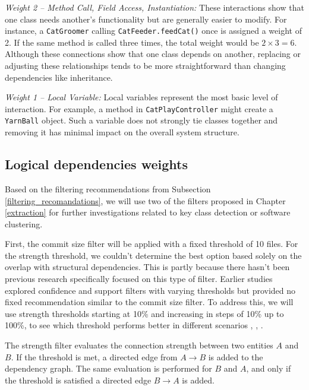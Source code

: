\textit{Weight 2 – Method Call, Field Access, Instantiation:}  
These interactions show that one class needs another’s functionality but are generally easier to modify. For instance, a \texttt{CatGroomer} calling \texttt{CatFeeder.feedCat()} once is assigned a weight of 2. If the same method is called three times, the total weight would be \(2 \times 3 = 6\). Although these connections show that one class depends on another, replacing or adjusting these relationships tends to be more straightforward than changing dependencies like inheritance.

\textit{Weight 1 – Local Variable:}  
Local variables represent the most basic level of interaction. For example, a method in \texttt{CatPlayController} might create a \texttt{YarnBall} object. Such a variable does not strongly tie classes together and removing it has minimal impact on the overall system structure.




\subsection{Logical dependencies weights}
\label{subsec:logical_weights}
\hspace{4em}Based on the filtering recommendations from Subsection \ref{filtering_recomandations}, we will use two of the filters proposed in Chapter \ref{extraction} for further investigations related to key class detection or software clustering.

First, the commit size filter will be applied with a fixed threshold of 10 files. For the strength threshold, we couldn't determine the best option based solely on the overlap with structural dependencies. This is partly because there hasn’t been previous research specifically focused on this type of filter. Earlier studies explored confidence and support filters with varying thresholds but provided no fixed recommendation similar to the commit size filter. To address this, we will use strength thresholds starting at 10\% and increasing in steps of 10\% up to 100\%, to see which threshold performs better in different scenarios \cite{b4}, \cite{DepSACI}, \cite{enase19}.

The strength filter evaluates the connection strength between two entities $A$ and $B$. If the threshold is met, a directed edge from $A \rightarrow B$ is added to the dependency graph. The same evaluation is performed for $B$ and $A$, and only if the threshold is satisfied a directed edge $B \rightarrow A$ is added.

